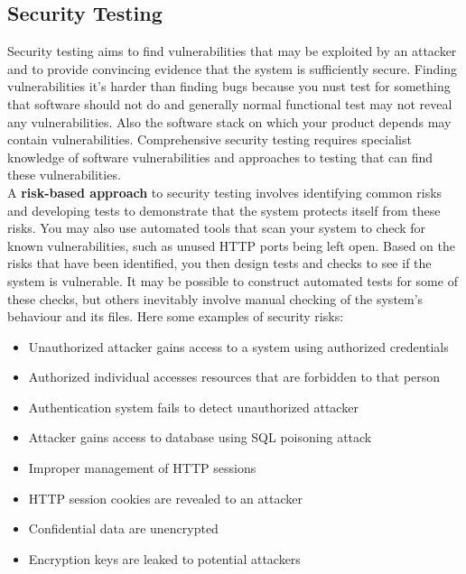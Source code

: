 \documentclass[10pt,a4paper]{report}
\begin{document}
\subsection{Security Testing}
 Security testing aims to find vulnerabilities that may be exploited by an
attacker and to provide convincing evidence that the system is
sufficiently secure. Finding vulnerabilities it's harder than finding bugs because you nust test for something that software should not do and generally normal functional test may not reveal any vulnerabilities. Also the software stack on which your product depends may contain vulnerabilities. 
Comprehensive security testing requires specialist knowledge of
software vulnerabilities and approaches to testing that can find these
vulnerabilities.\\
A \textbf{risk-based approach} to security testing involves identifying common
risks and developing tests to demonstrate that the system protects itself
from these risks.
You may also use automated tools that scan your system to check for
known vulnerabilities, such as unused HTTP ports being left open.
Based on the risks that have been identified, you then design tests and
checks to see if the system is vulnerable.
It may be possible to construct automated tests for some of these
checks, but others inevitably involve manual checking of the system’s
behaviour and its files.
Here some examples of security risks:
\begin{itemize}
	\item Unauthorized attacker gains access to a
	system using authorized credentials
	\item Authorized individual accesses resources
	that are forbidden to that person
	\item Authentication system fails to detect
	unauthorized attacker
	\item Attacker gains access to database using
	SQL poisoning attack
	\item Improper management of HTTP sessions
	\item HTTP session cookies are revealed to an
	attacker
	\item Confidential data are unencrypted
	\item Encryption keys are leaked to potential
	attackers
\end{itemize}
\end{document}
